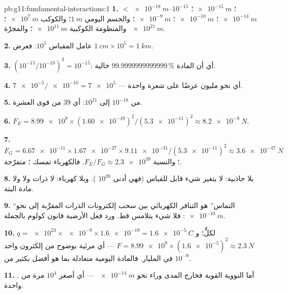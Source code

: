 \begin{solution}{pb:g11:fundamental-interactions:1}
\textbf{1.}  $< \qty{e-18}{m}$؛  $\qty{e-15}{m}$؛ 
$10^{-15}$--$\qty{e-14}{m}$؛  $\qty{e-10}{m}$؛ 
$\qty{e-9}{m}$؛ والجسم اليومي $\qty{1}{m}$؛ والكوكب $\qty{e7}{m}$؛
والمنظومة الكوكبية $\qty{e11}{m}$؛ والمجرّة $\qty{e21}{m}$.

\textbf{2.} عامل المقياس $10^{5}$: فعرض 
$\qty{1}{cm} \times 10^{5} = \qty{1}{km}$.

\textbf{3.} $(10^{-15}/10^{-10})^3 = 10^{-15}$: أي أن المادة
$\num{99.9999999999999}\,\%$ خالية.

\textbf{4.} $\num{7e-5}/\num{e-10} = \num{7e5}$  --- أي نحو
مليون عرضًا على شعرة واحدة.

\textbf{5.} من $10^{-18}$ إلى $10^{21}$: أي $39$  من قوى العشرة.

\textbf{6.} $F_E = \num{8.99e9} \times (\num{1.60e-19})^2 /
(\num{5.3e-11})^2 \approx \qty{8.2e-8}{N}$.

\textbf{7.} $F_G = \num{6.67e-11} \times \num{1.67e-27} \times
\num{9.11e-31}/(\num{5.3e-11})^2 \approx \qty{3.6e-47}{N}$؛ والنسبة
$F_E/F_G \approx \num{2.3e39}$. فالكهرباء تمسك ؛ 
متفرّجة.

\textbf{8.} بلا جاذبية: لا يتغير شيء قابل للقياس (فهي أدنى $10^{39}$
). وبلا كهرباء: لا ذرات ولا  ولا مادة البتة.

\textbf{9.} ``التماس'' هو التنافر الكهربائي بين سحب إلكترونات
الذرات المقرَّبة إلى نحو $\qty{e-10}{m}$: فلا شيء يتلامس قط.
ورد فعل الأرضية  قانون كولوم بالجملة.

\textbf{10.} $q = \num{e23} \times \num{e-9} \times \num{1.6e-19} =
\qty{1.6e-5}{C}$ لكلٍّ؛
و$F = \num{8.99e9} \times (\num{1.6e-5})^2 \approx \qty{2.3}{N}$ --- أي
 مرئية بوضوح من إلكترون واحد في المليار. فالمادة اليومية
متعادلة بما هو أفضل بكثير من $10^{-9}$.

\textbf{11.} . أما  النووية القوية فخارج
المدى وراء نحو $\qty{e-14}{m}$ --- أي أصغر $10^{4}$ مرة من
 واحدة.


\end{solution}
